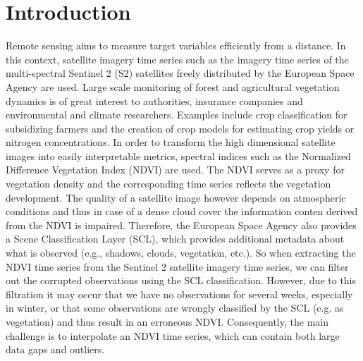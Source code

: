 \chapter{Introduction}

Remote sensing aims to measure target variables efficiently from a distance. In this context, satellite imagery time series such as the imagery time series of the multi-spectral Sentinel 2 (S2) satellites freely distributed by the European Space Agency are used.
Large scale monitoring of forest and agricultural vegetation dynamics is of great interest to authorities, insurance companies and environmental and climate researchers. Examples include crop classification for subsidizing farmers and the creation of crop models for estimating crop yields or nitrogen concentrations. 
In order to transform the high dimensional satellite images into easily interpretable metrics, spectral indices such as the Normalized Difference Vegetation Index (NDVI) are used. The NDVI serves as a proxy for vegetation density and the corresponding time series reflects the vegetation development. 
The quality of a satellite image however depends on atmospheric conditions and thus in case of a dense cloud cover the information conten derived from the NDVI is impaired. Therefore, the European Space Agency also provides a Scene Classification Layer (SCL), which provides additional metadata about what is observed (e.g., shadows, clouds, vegetation, etc.). So when extracting the NDVI time series from the Sentinel 2 satellite imagery time series, we can filter out the corrupted observations using the SCL classification. However, due to this filtration it may occur that we have no observations for several weeks, especially in winter, or that some observations are wrongly classified by the SCL (e.g. as vegetation) and thus result in an erroneous NDVI. Consequently, the main challenge is to interpolate an NDVI time series, which can contain both large data gaps and outliers. 


